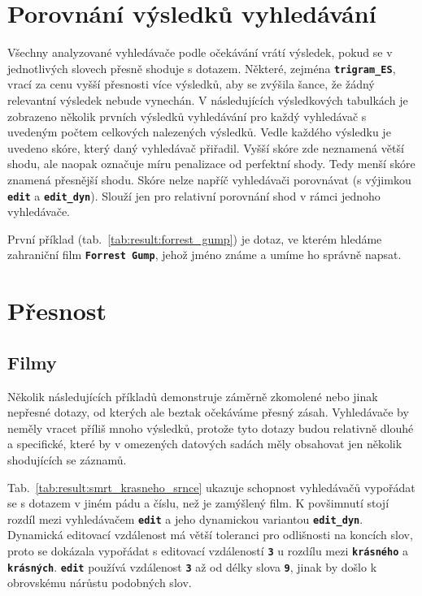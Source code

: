 \documentclass[11pt,letterpaper,oneside,openright]{book}
\newcommand{\bftt}[1]{\texttt{\textbf{#1}}}
\begin{document}
\section{Porovnání výsledků vyhledávání}
Všechny analyzované vyhledávače podle očekávání vrátí výsledek, pokud se v
jednotlivých slovech přesně shoduje s dotazem. Některé, zejména
\bftt{trigram\_ES}, vrací za cenu vyšší přesnosti více výsledků, aby se zvýšila
šance, že žádný relevantní výsledek nebude vynechán.  V následujících
výsledkových tabulkách je zobrazeno několik prvních výsledků vyhledávání pro
každý vyhledávač s uvedeným počtem celkových nalezených výsledků. Vedle každého
výsledku je uvedeno skóre, který daný vyhledávač přiřadil. Vyšší skóre zde
neznamená větší shodu, ale naopak označuje míru penalizace od perfektní shody.
Tedy menší skóre znamená přesnější shodu. Skóre nelze napříč vyhledávači
porovnávat (s výjimkou \bftt{edit} a \bftt{edit\_dyn}). Slouží jen pro
relativní porovnání shod v rámci jednoho vyhledávače.

\mbox{}\mbox{}

První příklad (tab.~\ref{tab:result:forrest_gump}) je dotaz, ve kterém hledáme
zahraniční film \bftt{Forrest Gump}, jehož jméno známe a umíme ho správně
napsat.

\section{Přesnost}
\subsection{Filmy}
Několik následujících příkladů demonstruje záměrně zkomolené nebo jinak
nepřesné dotazy, od kterých ale beztak očekáváme přesný zásah.
Vyhledávače by neměly vracet příliš mnoho výsledků, protože tyto dotazy
budou relativně dlouhé a specifické, které by v omezených datových
sadách měly obsahovat jen několik shodujících se záznamů.

\mbox{}\mbox{}

Tab.~\ref{tab:result:smrt_krasneho_srnce} ukazuje schopnost vyhledávačů
vypořádat se s dotazem v jiném pádu a číslu, než je zamýšlený film. K
povšimnutí stojí rozdíl mezi vyhledávačem \bftt{edit} a jeho dynamickou
variantou \bftt{edit\_dyn}. Dynamická editovací vzdálenost má větší toleranci
pro odlišnosti na koncích slov, proto se dokázala vypořádat s editovací
vzdáleností \bftt{3} u rozdílu mezi \bftt{krásného} a \bftt{krásných}.
\bftt{edit} používá vzdálenost \bftt{3} až od délky slova \bftt{9}, jinak by
došlo k obrovskému nárůstu podobných slov.
\end{document}
